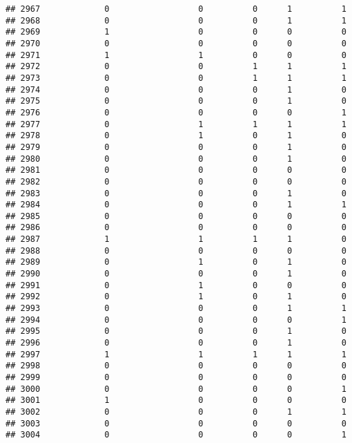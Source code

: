 \documentclass[
]{article}
\begin{document}
\begin{verbatim}
## 2967             0                  0          0      1          1
## 2968             0                  0          0      1          1
## 2969             1                  0          0      0          0
## 2970             0                  0          0      0          0
## 2971             1                  1          0      0          0
## 2972             0                  0          1      1          1
## 2973             0                  0          1      1          1
## 2974             0                  0          0      1          0
## 2975             0                  0          0      1          0
## 2976             0                  0          0      0          1
## 2977             0                  1          1      1          1
## 2978             0                  1          0      1          0
## 2979             0                  0          0      1          0
## 2980             0                  0          0      1          0
## 2981             0                  0          0      0          0
## 2982             0                  0          0      0          0
## 2983             0                  0          0      1          0
## 2984             0                  0          0      1          1
## 2985             0                  0          0      0          0
## 2986             0                  0          0      0          0
## 2987             1                  1          1      1          0
## 2988             0                  0          0      0          0
## 2989             0                  1          0      1          0
## 2990             0                  0          0      1          0
## 2991             0                  1          0      0          0
## 2992             0                  1          0      1          0
## 2993             0                  0          0      1          1
## 2994             0                  0          0      0          1
## 2995             0                  0          0      1          0
## 2996             0                  0          0      1          0
## 2997             1                  1          1      1          1
## 2998             0                  0          0      0          0
## 2999             0                  0          0      0          0
## 3000             0                  0          0      0          1
## 3001             1                  0          0      0          0
## 3002             0                  0          0      1          1
## 3003             0                  0          0      0          0
## 3004             0                  0          0      0          1

\end{verbatim}
\end{document}
